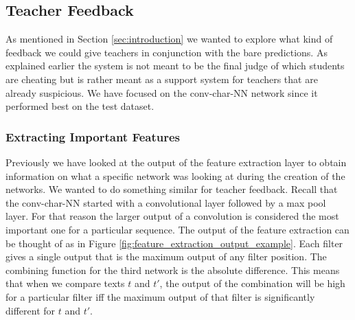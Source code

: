 \subsection{Teacher Feedback}\label{subsec:teacher_feedback_text_comparisons}

As mentioned in Section \ref{sec:introduction} we wanted to explore what kind
of feedback we could give teachers in conjunction with the bare predictions.
As explained earlier the system is not meant to be the final judge of which
students are cheating but is rather meant as a support system for teachers that
are already suspicious. We have focused on the \gls{conv-char-NN} network since
it performed best on the test dataset.


\subsubsection{Extracting Important Features}

Previously we have looked at the output of the feature extraction layer to
obtain information on what a specific network was looking at during the
creation of the networks. We wanted to do something similar for teacher
feedback. Recall that the \gls{conv-char-NN} started with a convolutional
layer followed by a max pool layer. For that reason the larger output
of a convolution is considered the most important one for a particular
sequence. The output of the feature extraction can be thought of as in Figure
\ref{fig:feature_extraction_output_example}. Each filter gives a single output
that is the maximum output of any filter position. The combining function for
the third network is the absolute difference. This means that when we compare
texts $t$ and $t'$, the output of the combination will be high for a particular
filter iff the maximum output of that filter is significantly different for $t$
and $t'$.


